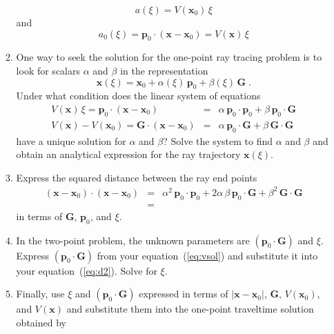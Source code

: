 \begin{enumerate}
\begin{enumerate}
\begin{equation}
    \label{eq:asol}
    a(\xi) = V(\mathbf{x}_0)\,\xi
  \end{equation}
  and
  \begin{equation}
    \label{eq:a0sol}
    a_0(\xi) = \mathbf{p}_0 \cdot (\mathbf{x} - \mathbf{x}_0) = V(\mathbf{x})\,\xi
  \end{equation}
\item One way to seek the solution for the one-point ray tracing
  problem is to look for scalars $\alpha$ and $\beta$ in the representation
\begin{equation}
  \label{eq:xsol}
  \mathbf{x}(\xi) = \mathbf{x}_0 + \alpha(\xi)\,\mathbf{p}_0 + \beta(\xi)\,\mathbf{G}\;.
\end{equation}
Under what condition does the linear system of equations
\begin{eqnarray}
  \label{eq:linsys1}
  V(\mathbf{x})\,\xi = \mathbf{p}_0 \cdot (\mathbf{x} - \mathbf{x}_0) & = & 
  \alpha\,\mathbf{p}_0 \cdot \mathbf{p}_0 + \beta\,\mathbf{p}_0 \cdot \mathbf{G} \\
  \label{eq:linsys2}
  V(\mathbf{x}) - V(\mathbf{x}_0) = \mathbf{G} \cdot (\mathbf{x} - \mathbf{x}_0) & = &
  \alpha\,\mathbf{p}_0 \cdot \mathbf{G} + \beta\,\mathbf{G} \cdot \mathbf{G}
\end{eqnarray}
have a unique solution for $\alpha$ and $\beta$? Solve the system to
find $\alpha$ and $\beta$ and obtain an analytical expression for
the ray trajectory $\mathbf{x}(\xi)$.
\item Express the squared distance between the ray end points
  \begin{eqnarray}
  \nonumber
    (\mathbf{x} - \mathbf{x}_0) \cdot (\mathbf{x} - \mathbf{x}_0) & = &
    \alpha^2\,\mathbf{p}_0 \cdot \mathbf{p}_0 + 2 \alpha\,\beta\,\mathbf{p}_0 \cdot \mathbf{G} +
    \beta^2\,\mathbf{G} \cdot \mathbf{G} \\
    & = & 
    \label{eq:d2} 
  \end{eqnarray}
  in terms of $\mathbf{G}$, $\mathbf{p}_0$, and $\xi$. 
\item In the two-point problem, the unknown
  parameters are $(\mathbf{p}_0 \cdot \mathbf{G})$ and $\xi$.
  Express $(\mathbf{p}_0 \cdot \mathbf{G})$ from your
  equation~(\ref{eq:vsol}) and substitute it into your
  equation~(\ref{eq:d2}). Solve for $\xi$. 
\item Finally, use $\xi$ and $(\mathbf{p}_0 \cdot \mathbf{G})$ 
  expressed in terms of $|\mathbf{x} - \mathbf{x}_0|$,
  $\mathbf{G}$, $V(\mathbf{x}_0)$, and $V(\mathbf{x})$ and
  substitute them into the one-point traveltime solution obtained by

\end{enumerate}
\end{enumerate}
